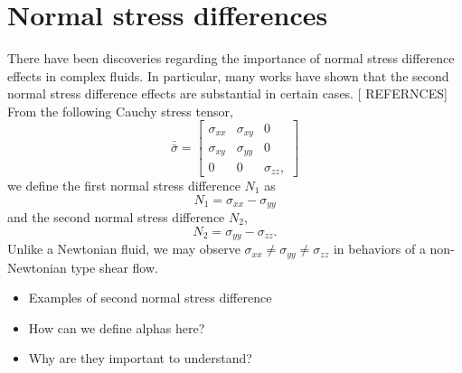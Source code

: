 \section{Normal stress differences}
There have been discoveries regarding the importance of normal stress difference effects in complex fluids. In particular, many works have shown that the second normal stress difference effects are substantial in certain cases. [{\color{blue} REFERNCES}]
From the following Cauchy stress tensor, 
\begin{equation}
  \bar{\bar{\sigma}} = 
  \begin{bmatrix}
    \sigma_{xx} & \sigma_{xy} & 0 
    \\
    \sigma_{xy} & \sigma_{yy} & 0 
    \\
    0 & 0 & \sigma_{zz},
  \end{bmatrix}
  \label{eq_cauchy_mx}
\end{equation} 
we define the first normal stress difference $N_1$ as 
\begin{equation}
  N_1 = \sigma_{xx} - \sigma_{yy}
\end{equation}
and the second normal stress difference $N_2$,
\begin{equation}
  N_2 = \sigma_{yy} - \sigma_{zz}.
\end{equation}
Unlike a Newtonian fluid, we may observe $\sigma_{xx} \neq \sigma_{yy} \neq \sigma_{zz}$ in behaviors of a non-Newtonian type shear flow.
\begin{itemize}
  \item Examples of second normal stress difference
  \item How can we define alphas here? 
  \item Why are they important to understand? 
\end{itemize}

